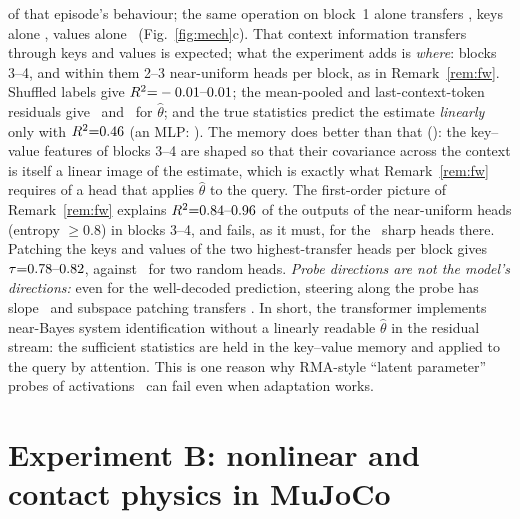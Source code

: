 of that episode's behaviour; the same operation on block~1 alone transfers \AkvOne, keys alone \AkOnly, values alone
\AvOnly\ (Fig.~\ref{fig:mech}c). That context information transfers through keys and values is expected; what the
experiment adds is \emph{where}: blocks 3--4, and within them 2--3 near-uniform heads per block, as in Remark~\ref{rem:fw}. Shuffled labels give $R^2{=}-0.01\mbox{--}0.01$; the mean-pooled and last-context-token residuals give \AcMeanTheta\ and
\AcLastTheta\ for $\hat\theta$; and the true statistics predict the estimate \emph{linearly} only with $R^2{=}0.46$ (an MLP: \AcCeilMlp). The memory does
better than that (\AcFwTheta): the key--value features of blocks 3--4 are shaped so that their covariance across the
context is itself a linear image of the estimate, which is exactly what Remark~\ref{rem:fw} requires of a head that applies
$\hat\theta$ to the query.
The first-order picture of Remark~\ref{rem:fw} explains $R^2{=}0.84\mbox{--}0.96$ of the outputs of the near-uniform heads
(entropy $\ge0.8$) in blocks 3--4, and fails, as it must, for the \ANsharp\ sharp heads there. Patching the keys and values of the two highest-transfer heads per block gives $\tau{=}0.78\mbox{--}0.82$, against
\ARandTwo\ for two random heads. \emph{Probe directions are not the model's directions:} even for the well-decoded
prediction, steering along the probe has slope \AsteerYhat\ and subspace patching transfers \AtauYhat. In short, the
transformer implements near-Bayes system identification without a linearly readable $\hat\theta$ in the residual stream:
the sufficient statistics are held in the key--value memory and applied to the query by attention. This is one reason why
RMA-style ``latent parameter'' probes of activations~\citep{kumar2021rma,chamachot2026evaluating} can fail even when
adaptation works.

\section{Experiment B: nonlinear and contact physics in MuJoCo}\label{sec:expb}



